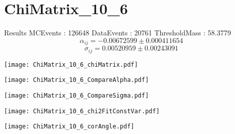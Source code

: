 \documentclass[a4paper,12pt]{article}
\begin{document}
\section{ChiMatrix\_10\_6}
\begin{minipage}{0.49\linewidth} Results \newline
MCEvents : 126648\newline
DataEvents : 20761 \newline
ThresholdMass : 58.3779\\
$$\alpha_{ij} = -0.00672599\pm 0.000411654$$
$$\sigma_{ij} = 0.00520959\pm 0.00243091$$
\end{minipage}\hfill
\begin{minipage}{0.49\linewidth} 
\texttt{[image: ChiMatrix\_10\_6\_chiMatrix.pdf]}\\
\end{minipage}
\hfill
\begin{minipage}{0.49\linewidth} 
\texttt{[image: ChiMatrix\_10\_6\_CompareAlpha.pdf]}\\
\end{minipage}
\hfill
\begin{minipage}{0.49\linewidth} 
\texttt{[image: ChiMatrix\_10\_6\_CompareSigma.pdf]}\\
\end{minipage}
\begin{minipage}{0.49\linewidth} 
\texttt{[image: ChiMatrix\_10\_6\_chi2FitConstVar.pdf]}\\
\end{minipage}
\hfill
\begin{minipage}{0.49\linewidth} 
\texttt{[image: ChiMatrix\_10\_6\_corAngle.pdf]}\\
\end{minipage}
\end{document}
